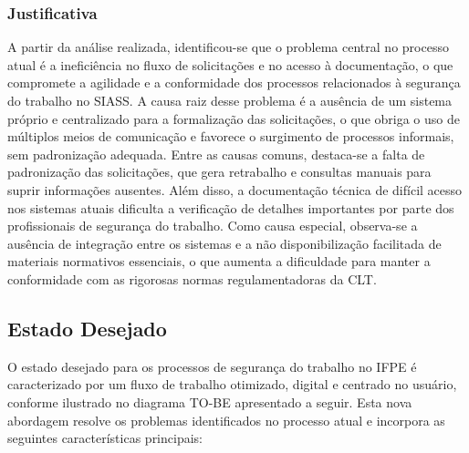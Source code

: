 \documentclass[12pt,a4paper]{article}
\begin{document}
\subsubsection{Justificativa}

A partir da análise realizada, identificou-se que o problema central no processo atual é a ineficiência no fluxo de solicitações e no acesso à documentação, o que compromete a agilidade e a conformidade dos processos relacionados à segurança do trabalho no SIASS. A causa raiz desse problema é a ausência de um sistema próprio e centralizado para a formalização das solicitações, o que obriga o uso de múltiplos meios de comunicação e favorece o surgimento de processos informais, sem padronização adequada. Entre as causas comuns, destaca-se a falta de padronização das solicitações, que gera retrabalho e consultas manuais para suprir informações ausentes. Além disso, a documentação técnica de difícil acesso nos sistemas atuais dificulta a verificação de detalhes importantes por parte dos profissionais de segurança do trabalho. Como causa especial, observa-se a ausência de integração entre os sistemas e a não disponibilização facilitada de materiais normativos essenciais, o que aumenta a dificuldade para manter a conformidade com as rigorosas normas regulamentadoras da CLT.

\clearpage
\subsection{Estado Desejado}

O estado desejado para os processos de segurança do trabalho no IFPE é caracterizado por um fluxo de trabalho otimizado, digital e centrado no usuário, conforme ilustrado no diagrama TO-BE apresentado a seguir. Esta nova abordagem resolve os problemas identificados no processo atual e incorpora as seguintes características principais:
\end{document}
